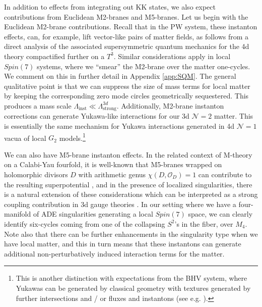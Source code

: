 \documentclass[12pt]{article}%
\numberwithin{equation}{section}
\renewcommand{\(}{\left(}
\renewcommand{\)}{\right)}
\renewcommand{\[}{\left[}
\renewcommand{\]}{\right]}
\begin{document}
In addition to effects from integrating out KK states, we also expect contributions from Euclidean M2-branes and M5-branes.
Let us begin with the Euclidean M2-brane contributions. Recall that in the PW system,
these instanton effects, can, for example, lift vector-like pairs of matter fields, as follows from a direct analysis of the associated supersymmetric quantum mechanics for the 4d theory compactified further on a $T^3$. Similar considerations apply
in local $Spin(7)$ systems, where we ``smear'' the M2-brane over the matter one-cycles. We comment on this
in further detail in Appendix \ref{app:SQM}. The general qualitative point
is that we can suppress the size of mass terms for local matter by keeping the corresponding zero mode circles geometrically sequestered.
This produces a mass scale $\Lambda_{\mathrm{inst}} \ll \Lambda^{3d}_{\mathrm{strong}}$. Additionally, M2-brane instanton corrections can generate Yukawa-like interactions for our 3d $\mathcal{N} = 2$ matter. This is essentially the same mechanism for Yukawa interactions
generated in 4d $\mathcal{N} = 1$ vacua of local $G_2$ models.\footnote{This is another distinction with expectations
from the BHV system, where Yukawas can be generated by classical geometry with textures generated by further intersections and / or fluxes and instantons (see e.g. \cite{Beasley:2008dc, Beasley:2008kw, Heckman:2008qa, Bouchard:2009bu, Cecotti:2009zf, Marchesano:2009rz, Marchesano:2015dfa, Cvetic:2019sgs}).}

We can also have M5-brane instanton effects. In the related context of M-theory on a Calabi-Yau fourfold,
it is well-known that M5-branes wrapped on holomorphic divisors $D$ with arithmetic genus $\chi(D, \mathcal{O}_D) = 1$
can contribute to the resulting superpotential \cite{Witten:1996bn}, and in the presence of localized singularities, there is a natural
extension of these considerations which can be interpreted as a strong coupling contribution in 3d gauge theories \cite{Katz:1996th}. In our setting where we have a four-manifold of ADE singularities generating a local $Spin(7)$ space, we can clearly identify six-cycles coming from one of the collapsing $S^{2}$'s in the fiber, over $M_4$. Note also that there can be further enhancements in the singularity type when we have local matter, and this in turn means that these instantons can generate additional non-perturbatively induced interaction terms for the matter.
\end{document}

